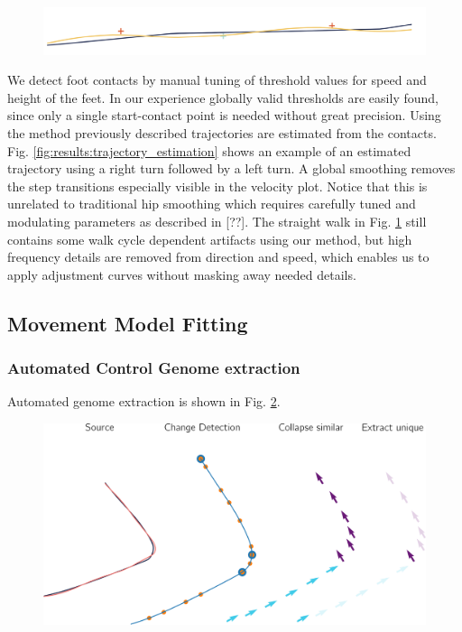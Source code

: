 \begin{figure}
    \centering
    \includegraphics[width=1.0\columnwidth]{img/straight_trajectory.png}
    \caption{}
    \label{fig:results:trajectory_straight}
\end{figure}
We detect foot contacts by manual tuning of threshold values for speed and height of the feet. In our experience globally valid thresholds are easily found, since only a single start-contact point is needed without great precision. Using the method previously described trajectories are estimated from the contacts. Fig. \ref{fig:results:trajectory_estimation} shows an example of an estimated trajectory using a right turn followed by a left turn. A global smoothing removes the step transitions especially visible in the velocity plot. Notice that this is unrelated to traditional hip smoothing which requires carefully tuned and modulating parameters as described in [??]. The straight walk in Fig. \ref{fig:results:trajectory_straight} still contains some walk cycle dependent artifacts using our method, but high frequency details are removed from direction and speed, which enables us to apply adjustment curves without masking away needed details. 

\subsection{Movement Model Fitting}
\subsubsection{Automated Control Genome extraction}
Automated genome extraction is shown in Fig. \ref{fig:results:genome_extraction}.
\begin{figure}
    \centering
    \includegraphics[width=1.0\columnwidth]{img/genome_extract.png}
    \caption{}
    \label{fig:results:genome_extraction}
\end{figure}
